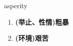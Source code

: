 
\begin{frame}
{\huge asperity}
\begin{center}
\begin{enumerate}\Large
  \item \textbf{(举止、性情)粗暴}
  \item \textbf{(环境)艰苦}
\end{enumerate}
\end{center}
\end{frame}
